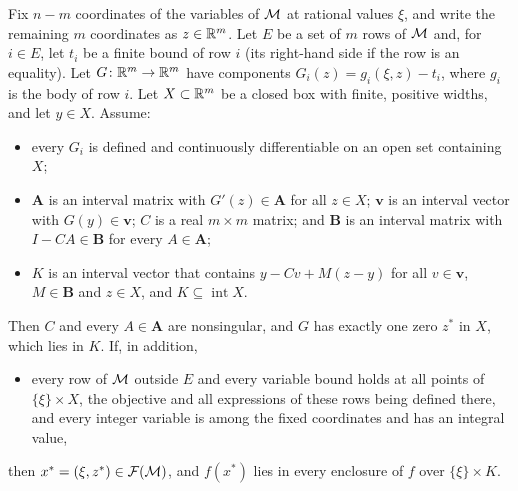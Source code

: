 \begin{theorem}\label{thm:pts-krawczyk}
Fix $n-m$ coordinates of the variables of $\mathcal{M}$ at rational values $\xi$, and write the remaining $m$ coordinates as $z\in\mathbb{R}^m$.
Let $E$ be a set of $m$ rows of $\mathcal{M}$ and, for $i\in E$, let $t_i$ be a finite bound of row $i$ (its right-hand side if the row is an equality).
Let $G\colon\mathbb{R}^m\to\mathbb{R}^m$ have components $G_i(z)=g_i(\xi,z)-t_i$, where $g_i$ is the body of row $i$.
Let $X\subset\mathbb{R}^m$ be a closed box with finite, positive widths, and let $y\in X$.
Assume:
\begin{itemize}\setlength{\itemsep}{0pt}\setlength{\parsep}{0pt}
\item[(a)] every $G_i$ is defined and continuously differentiable on an open set containing $X$;
\item[(b)] $\mathbf{A}$ is an interval matrix with $G'(z)\in\mathbf{A}$ for all $z\in X$; $\mathbf{v}$ is an interval vector with $G(y)\in\mathbf{v}$; $C$ is a real $m\times m$ matrix; and $\mathbf{B}$ is an interval matrix with $I-CA\in\mathbf{B}$ for every $A\in\mathbf{A}$;
\item[(c)] $K$ is an interval vector that contains $y-Cv+M(z-y)$ for all $v\in\mathbf{v}$, $M\in\mathbf{B}$ and $z\in X$, and $K\subseteq\operatorname{int}X$.
\end{itemize}
Then $C$ and every $A\in\mathbf{A}$ are nonsingular, and $G$ has exactly one zero $z^*$ in $X$, which lies in $K$.
If, in addition,
\begin{itemize}\setlength{\itemsep}{0pt}\setlength{\parsep}{0pt}
\item[(d)] every row of $\mathcal{M}$ outside $E$ and every variable bound holds at all points of $\{\xi\}\times X$, the objective and all expressions of these rows being defined there, and every integer variable is among the fixed coordinates and has an integral value,
\end{itemize}
then $x^*=(\xi,z^*)\in\mathcal{F}(\mathcal{M})$, and $f(x^*)$ lies in every enclosure of $f$ over $\{\xi\}\times K$.
\end{theorem}

